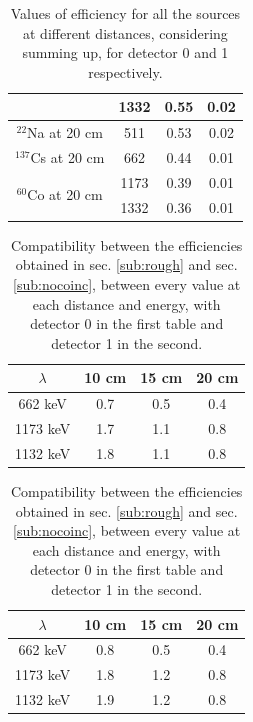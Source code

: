 \begin{table}[h]
\begin{subtable}
\begin{tabular}{|c|c|c|c|}
        &1332 &0.55 & 0.02 \\
        \hline
        $^{22}$Na at 20 cm & 511 &0.53&0.02\\
        \hline
        $^{137}$Cs at 20 cm & 662 & 0.44 & 0.01\\
        \hline
        \multirow{2}{*}{$^{60}$Co at 20 cm}&1173 &0.39 & 0.01 \\
        &1332 &0.36 & 0.01 \\
        \hline
        \end{tabular}
     \end{subtable}
     \caption{Values of efficiency for all the sources at different distances, considering summing up, for detector 0 and 1 respectively.}
     \label{tab:eff_nocoinc}
\end{table}

\begin{table}[h]
    \begin{subtable}
        \centering
        \begin{tabular}{|c|c|c|c|}
        \hline
        $\lambda$& 10 cm & 15 cm & 20 cm  \\
        \hline
        662 keV & 0.7 & 0.5 & 0.4 \\
        1173 keV& 1.7 & 1.1 & 0.8 \\
        1132 keV& 1.8 & 1.1 & 0.8 \\
        \hline
        \end{tabular}
    \end{subtable}
    \qquad
    \qquad
    \qquad
    \begin{subtable}
        \centering
        \begin{tabular}{|c|c|c|c|}
        \hline
        $\lambda$ & 10 cm & 15 cm & 20 cm \\
        \hline
        662 keV & 0.8 & 0.5 & 0.4 \\
        1173 keV& 1.8 & 1.2 & 0.8 \\
        1132 keV& 1.9 & 1.2 & 0.8 \\
        \hline
        \end{tabular}
     \end{subtable}
     \caption{Compatibility between the efficiencies obtained in sec. \ref{sub:rough} and sec. \ref{sub:nocoinc}, between every value at each distance and energy, with detector 0 in the first table and detector 1 in the second.}
     \label{tab:eff_comp}
\end{table}



